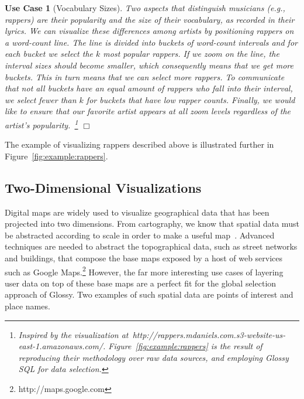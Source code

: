 \documentclass[11pt, oneside]{report}
\newtheorem{example}{Use Case}
\newcommand{\mathendbox}{\hfill$\Box$}
\begin{document}
\begin{example}[Vocabulary Sizes]\label{ex:rappers}
Two aspects that distinguish musicians (e.g., rappers) are their popularity and the size of their vocabulary, as recorded in their lyrics. We can visualize these differences among artists by positioning rappers on a word-count line. The line is divided into buckets of word-count intervals and for each bucket we select the $k$ most popular rappers. If we zoom on the line, the interval sizes should become smaller, which consequently means that we get more buckets. This in turn means that we can select more rappers. To communicate that not all buckets have an equal amount of rappers who fall into their interval, we select fewer than $k$ for buckets that have low rapper counts. Finally, we would like to ensure that our favorite artist appears at all zoom levels regardless of the artist's popularity.~\footnote{Inspired by the visualization at~http://rappers.mdaniels.com.s3-website-us-east-1.amazonaws.com/. Figure~\ref{fig:example:rappers} is the result of reproducing their methodology over raw data sources, and employing Glossy SQL for data selection.} \mathendbox
\end{example}

The example of visualizing rappers described above is illustrated further in Figure~\ref{fig:example:rappers}.

\subsection{Two-Dimensional Visualizations}
\label{sec:examples:two:dimensional}

Digital maps are widely used to visualize geographical data that has been projected into two dimensions. From cartography, we know that spatial data must be abstracted according to scale in order to make a useful map~\cite{NeunBW09:GeneralizationWeb,WareJT03:GeneralizationMeta}. Advanced techniques are needed to abstract the topographical data, such as street networks and buildings, that compose the base maps exposed by a host of web services such as Google Maps.\footnote{http://maps.google.com} However, the far more interesting use cases of layering user data on top of these base maps are a perfect fit for the global selection approach of Glossy. Two examples of such spatial data are points of interest and place names. 
\end{document}
